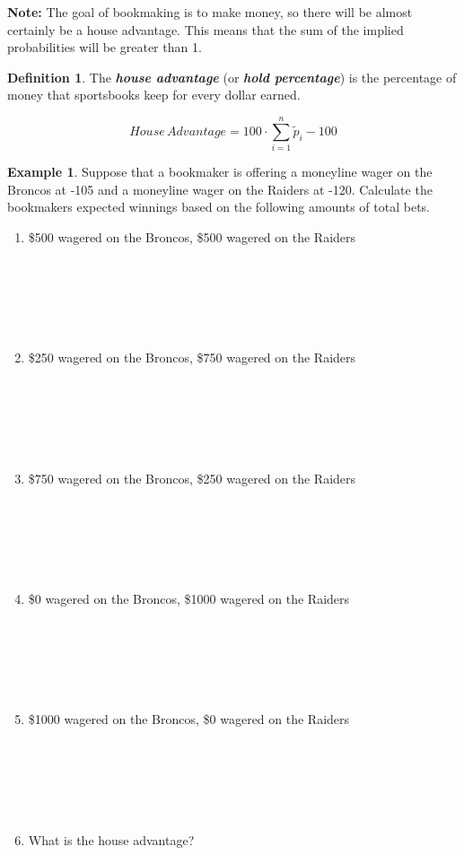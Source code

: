 \documentclass[
  11pt,
]{book}
\theoremstyle{definition}
\newtheorem{definition}{Definition}[chapter]
\theoremstyle{definition}
\newtheorem{example}{Example}[chapter]
\theoremstyle{definition}
\theoremstyle{definition}
\theoremstyle{remark}
\begin{document}
\textbf{Note:} The goal of bookmaking is to make money, so there will be almost certainly be a house advantage. This means that the sum of the implied probabilities will be greater than 1.

\begin{definition}
The \textbf{\emph{house advantage}} (or \textbf{\emph{hold percentage}}) is the percentage of money that sportsbooks keep for every dollar earned.

\[House \, Advantage = 100 \cdot \sum_{i=1}^n \tilde{p}_i - 100\]
\end{definition}

\newpage

\begin{example}
Suppose that a bookmaker is offering a moneyline wager on the Broncos at -105 and a moneyline wager on the Raiders at -120. Calculate the bookmakers expected winnings based on the following amounts of total bets.
\end{example}

\begin{enumerate}
\def\labelenumi{(\alph{enumi})}
\item
  \$500 wagered on the Broncos, \$500 wagered on the Raiders\\
  \strut \\
  \strut \\
  \strut \\
  \vfill
\item
  \$250 wagered on the Broncos, \$750 wagered on the Raiders\\
  \strut \\
  \strut \\
  \strut \\
  \vfill
\item
  \$750 wagered on the Broncos, \$250 wagered on the Raiders\\
  \strut \\
  \strut \\
  \strut \\
  \vfill
\item
  \$0 wagered on the Broncos, \$1000 wagered on the Raiders\\
  \strut \\
  \strut \\
  \strut \\
  \vfill
\item
  \$1000 wagered on the Broncos, \$0 wagered on the Raiders\\
  \strut \\
  \strut \\
  \strut \\
  \vfill
\item
  What is the house advantage?\\
  \strut \\
  \strut \\
  \strut \\
  \vfill
\end{enumerate}
\end{document}
